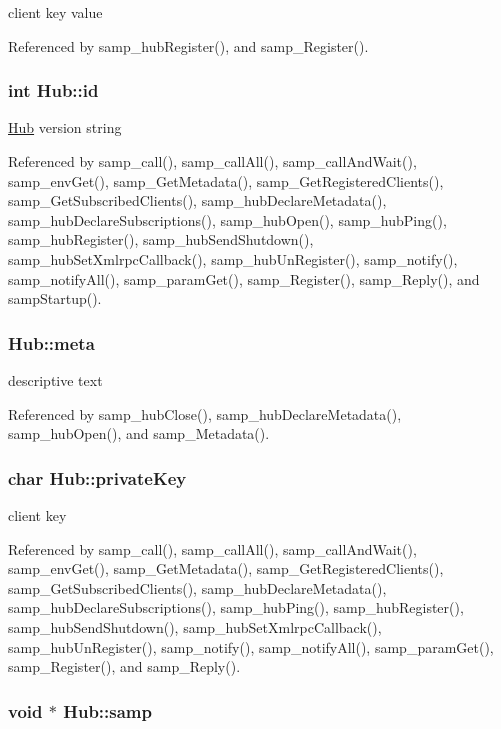 client key value 

Referenced by samp\_\-hubRegister(), and samp\_\-Register().\hypertarget{structHub_3546ac45740591096b9bdc4c37b8d5f5}{
\subsubsection[{id}]{\setlength{\rightskip}{0pt plus 5cm}int {\bf Hub::id}}}
\label{structHub_3546ac45740591096b9bdc4c37b8d5f5}


\hyperlink{structHub}{Hub} version string 

Referenced by samp\_\-call(), samp\_\-callAll(), samp\_\-callAndWait(), samp\_\-envGet(), samp\_\-GetMetadata(), samp\_\-GetRegisteredClients(), samp\_\-GetSubscribedClients(), samp\_\-hubDeclareMetadata(), samp\_\-hubDeclareSubscriptions(), samp\_\-hubOpen(), samp\_\-hubPing(), samp\_\-hubRegister(), samp\_\-hubSendShutdown(), samp\_\-hubSetXmlrpcCallback(), samp\_\-hubUnRegister(), samp\_\-notify(), samp\_\-notifyAll(), samp\_\-paramGet(), samp\_\-Register(), samp\_\-Reply(), and sampStartup().\hypertarget{structHub_cfe9051f3f0d6fd908ddf394283d1262}{
\subsubsection[{meta}]{ {\bf Hub::meta}}}
\label{structHub_cfe9051f3f0d6fd908ddf394283d1262}


descriptive text 

Referenced by samp\_\-hubClose(), samp\_\-hubDeclareMetadata(), samp\_\-hubOpen(), and samp\_\-Metadata().\hypertarget{structHub_53b0a5acf4419ffff98c6510e84a9f62}{
\subsubsection[{privateKey}]{\setlength{\rightskip}{0pt plus 5cm}char {\bf Hub::privateKey}}}
\label{structHub_53b0a5acf4419ffff98c6510e84a9f62}


client key 

Referenced by samp\_\-call(), samp\_\-callAll(), samp\_\-callAndWait(), samp\_\-envGet(), samp\_\-GetMetadata(), samp\_\-GetRegisteredClients(), samp\_\-GetSubscribedClients(), samp\_\-hubDeclareMetadata(), samp\_\-hubDeclareSubscriptions(), samp\_\-hubPing(), samp\_\-hubRegister(), samp\_\-hubSendShutdown(), samp\_\-hubSetXmlrpcCallback(), samp\_\-hubUnRegister(), samp\_\-notify(), samp\_\-notifyAll(), samp\_\-paramGet(), samp\_\-Register(), and samp\_\-Reply().\hypertarget{structHub_cfd1b13e1f462d6595ce4e0b5ab08cb9}{
\subsubsection[{samp}]{\setlength{\rightskip}{0pt plus 5cm}void $\ast$ {\bf Hub::samp}}}
\label{structHub_cfd1b13e1f462d6595ce4e0b5ab08cb9}


